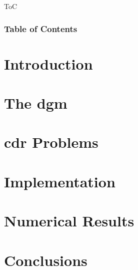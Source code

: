 
\begin{frame}{ToC}
    \frametitle{Table of Contents}
    \vspace*{\fill}
    \tableofcontents[hideallsubsections]
    \vspace*{\fill}
\end{frame}



\section{Introduction}




\section{The \texorpdfstring{\acrlong{dgm}}{}}




\section{\texorpdfstring{\acrlong{cdr}}{} Problems}




\section{Implementation}




\section{Numerical Results}




\section{Conclusions}

